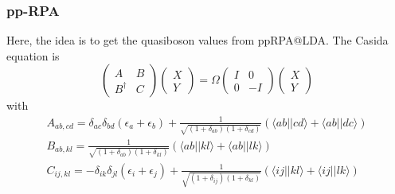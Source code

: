 \subsubsection{pp-RPA}
Here, the idea is to get the quasiboson values from ppRPA@LDA. The Casida equation is 
\begin{equation}
    \begin{pmatrix}
        A & B \\
        B^\dag & C
    \end{pmatrix}
    \begin{pmatrix}
        X \\
Y
    \end{pmatrix}
    =
    \Omega
    \begin{pmatrix}
        I & 0 \\
0 & -I
    \end{pmatrix}
    \begin{pmatrix}
        X \\
Y
    \end{pmatrix}
\end{equation}
with
\begin{align}
    A_{ab,cd} = \delta_{a c} \delta_{b d}\left(\epsilon_a+\epsilon_b\right) + \frac{1}{\sqrt{\left(1+\delta_{a b}\right)\left(1+\delta_{c d}\right)}}(\langle a b || c d\rangle+\langle a b || d c\rangle) \\
    B_{ab,kl} = \frac{1}{\sqrt{\left(1+\delta_{a b}\right)\left(1+\delta_{k l}\right)}}(\langle a b || k l\rangle+\langle a b || l k\rangle) \\
    C_{ij,kl} = -\delta_{i k} \delta_{j l}\left(\epsilon_i+\epsilon_j\right) + \frac{1}{\sqrt{\left(1+\delta_{i j}\right)\left(1+\delta_{k l}\right)}}(\langle i j || k l\rangle+\langle i j || l k\rangle)
\end{align}
